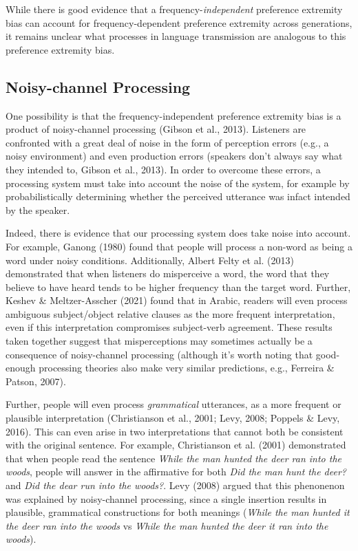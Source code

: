 \documentclass[10pt, letterpaper, hidelinks]{article}
\begin{document}
While there is good evidence that a frequency-\emph{independent}
preference extremity bias can account for frequency-dependent preference
extremity across generations, it remains unclear what processes in
language transmission are analogous to this preference extremity bias.

\hypertarget{noisy-channel-processing}{%
\subsection{Noisy-channel Processing}\label{noisy-channel-processing}}

One possibility is that the frequency-independent preference extremity
bias is a product of noisy-channel processing (Gibson et al., 2013).
Listeners are confronted with a great deal of noise in the form of
perception errors (e.g., a noisy environment) and even production errors
(speakers don't always say what they intended to, Gibson et al., 2013).
In order to overcome these errors, a processing system must take into
account the noise of the system, for example by probabilistically
determining whether the perceived utterance was infact intended by the
speaker.

Indeed, there is evidence that our processing system does take noise
into account. For example, Ganong (1980) found that people will process
a non-word as being a word under noisy conditions. Additionally, Albert
Felty et al. (2013) demonstrated that when listeners do misperceive a
word, the word that they believe to have heard tends to be higher
frequency than the target word. Further, Keshev \& Meltzer-Asscher
(2021) found that in Arabic, readers will even process ambiguous
subject/object relative clauses as the more frequent interpretation,
even if this interpretation compromises subject-verb agreement. These
results taken together suggest that misperceptions may sometimes
actually be a consequence of noisy-channel processing (although it's
worth noting that good-enough processing theories also make very similar
predictions, e.g., Ferreira \& Patson, 2007).

Further, people will even process \emph{grammatical} utterances, as a
more frequent or plausible interpretation (Christianson et al., 2001;
Levy, 2008; Poppels \& Levy, 2016). This can even arise in two
interpretations that cannot both be consistent with the original
sentence. For example, Christianson et al. (2001) demonstrated that when
people read the sentence \emph{While the man hunted the deer ran into
the woods}, people will answer in the affirmative for both \emph{Did the
man hunt the deer?} and \emph{Did the dear run into the woods?}. Levy
(2008) argued that this phenonenon was explained by noisy-channel
processing, since a single insertion results in plausible, grammatical
constructions for both meanings (\emph{While the man hunted it the deer
ran into the woods} vs \emph{While the man hunted the deer it ran into
the woods}).
\end{document}
